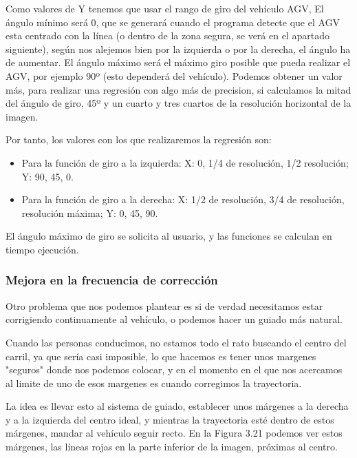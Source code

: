 Como valores de Y tenemos que usar el rango de giro del vehículo AGV, El ángulo mínimo será 0, que se generará cuando el programa detecte que el AGV esta centrado con la línea (o dentro de la zona segura, se verá en el apartado siguiente), según nos alejemos bien por la izquierda o por la derecha, el ángulo ha de aumentar. El ángulo máximo será el máximo giro posible que pueda realizar el AGV, por ejemplo 90º (esto dependerá del vehículo). Podemos obtener un valor más, para realizar una regresión con algo más de precision, si calculamos la mitad del ángulo de giro, 45º y un cuarto y tres cuartos de la resolución horizontal de la imagen. 


Por tanto, los valores con los que realizaremos la regresión son:

\begin{itemize}

	\item Para la función de giro a la izquierda: X: 0, 1/4 de resolución, 1/2 resolución; Y: 90, 45, 0.
	
	\item Para la función de giro a la derecha: X: 1/2 de resolución, 3/4 de resolución, resolución máxima; Y: 0, 45, 90.
\end{itemize}

El ángulo máximo de giro se solicita al usuario, y las funciones se calculan en tiempo ejecución.

\subsubsection{Mejora en la frecuencia de corrección}
Otro problema que nos podemos plantear es si de verdad necesitamos estar corrigiendo continuamente al vehículo, o podemos hacer un guiado más natural.

Cuando las personas conducimos, no estamos todo el rato buscando el centro del carril, ya que sería casi imposible, lo que hacemos es tener unos margenes "seguros" donde nos podemos colocar, y en el momento en el que nos acercamos al limite de uno de esos margenes es cuando corregimos la trayectoria.

La idea es llevar esto al sistema de guiado, establecer unos márgenes a la derecha y a la izquierda del centro ideal, y mientras la trayectoria esté dentro de estos márgenes, mandar al vehículo seguir recto. En la Figura 3.21 podemos ver estos márgenes, las líneas rojas en la parte inferior de la imagen, próximas al centro.

